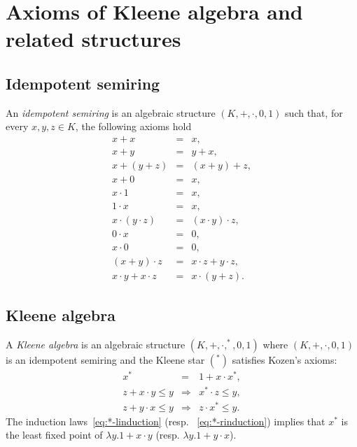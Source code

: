 \documentclass[review]{elsart}
\newenvironment{append}{}{}
\begin{document}
\begin{append}
\newpage
\appendix
\section{Axioms of Kleene algebra and related structures}\label{A:ka}
\subsection{Idempotent semiring}
An \emph{idempotent semiring} is an algebraic structure $(K,+,\cdot,0,1)$ such that, for every $x,y,z{\in}K$, the following axioms hold
\begin{eqnarray}
x + x & = & x,\label{eq:+-idem}\\
x + y & = &y + x,\label{eq:+-comm}\\
x + (y + z) & = & (x + y) + z,\label{eq:+-assoc}\\
x + 0 & = & x, \label{eq:+-zero}\\
x{\cdot} 1 & = & x,\label{eq:rone}\\
1{\cdot} x & = & x, \label{eq:lone}\\
x {\cdot} (y {\cdot} z) & = & (x {\cdot} y) \cdot z,\label{eq:seq-assoc}\\
0{\cdot} x& = & 0, \label{eq:left-zero}\\
x{\cdot} 0& = & 0, \label{eq:righ-zero}\\
(x+y){\cdot} z & = & x{\cdot} z + y\cdot z,\label{eq:+-dist-seq} \\
x{\cdot} y+x{\cdot} z & = & x {\cdot} (y+z).\label{eq:+-rdist-seq}
\end{eqnarray}
\subsection{Kleene algebra}
A \emph{Kleene algebra} is an algebraic structure $(K,+,\cdot,^*,0,1)$ where $(K,+,\cdot,0,1)$ is an idempotent semiring and the Kleene star $(^*)$ satisfies Kozen's axioms:
\begin{eqnarray}
x^* & = & 1 + x{\cdot} x^*,\label{eq:*-unfold}\\
z+x{\cdot} y\leq y & \Rightarrow & x^*{\cdot} z\leq y,\label{eq:*-linduction}\\
z+y{\cdot} x\leq y& \Rightarrow &z{\cdot} x^*\leq y.\label{eq:*-rinduction}
\end{eqnarray}
The induction laws~\ref{eq:*-linduction} (resp. ~\ref{eq:*-rinduction}) implies that $x^*$ is the least fixed point of $\lambda y.1+x{\cdot} y$ (resp. $\lambda y.1 + y{\cdot}x$).

\end{append}
\end{document}
